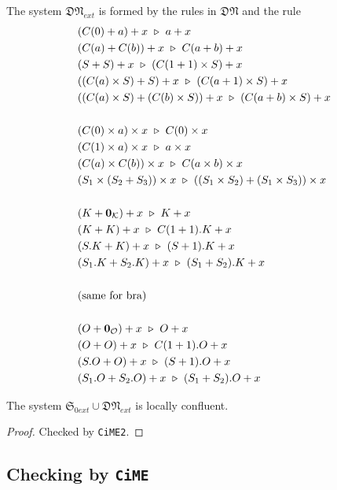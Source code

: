 \begin{proposition}
  The system $\mathfrak{DN}_{ext}$ is formed by the rules in $\mathfrak{DN}$ and the rule
  \begin{align*}
    & (C(0) + a) + x \ \triangleright\  a + x \\
    & (C(a) + C(b)) + x \ \triangleright\  C(a + b) + x \\
    & (S + S) + x \ \triangleright\  (C(1 + 1) \times S) + x \\
    & ((C(a) \times S) + S) + x \ \triangleright\  (C(a + 1) \times S) + x \\
    & ((C(a) \times S) + (C(b) \times S)) + x \ \triangleright\  (C(a + b) \times S) + x \\
    \\
    & (C(0) \times a) \times x \ \triangleright\  C(0) \times x \\
    & (C(1) \times a) \times x \ \triangleright\  a \times x \\
    & (C(a) \times C(b)) \times x \ \triangleright\  C(a \times b) \times x \\
    & (S_1 \times (S_2 + S_3)) \times x \ \triangleright\  ((S_1 \times S_2) + (S_1 \times S_3)) \times x \\
    \\
    & (K + \mathbf{0}_\mathcal{K}) + x \ \triangleright\  K + x \\
    & (K + K) + x \ \triangleright\  C(1 + 1).K + x \\
    & (S.K + K) + x \ \triangleright\  (S + 1).K + x \\
    & (S_1.K + S_2.K) + x \ \triangleright\  (S_1 + S_2).K + x \\
    \\
    & \textrm{(same for bra)}\\
    \\
    & (O + \mathbf{0}_\mathcal{O}) + x \ \triangleright\  O + x \\
    & (O + O) + x \ \triangleright\  C(1 + 1).O + x \\
    & (S.O + O) + x \ \triangleright\  (S + 1).O + x \\
    & (S_1.O + S_2.O) + x \ \triangleright\  (S_1 + S_2).O + x
  \end{align*}
\end{proposition}

\begin{proposition}
  The system $\mathfrak{S}_{0ext} \cup \mathfrak{DN}_{ext}$ is locally confluent.
\end{proposition}
\begin{proof}
  Checked by \texttt{CiME2}.
\end{proof}

\subsection{Checking by \texttt{CiME}}


